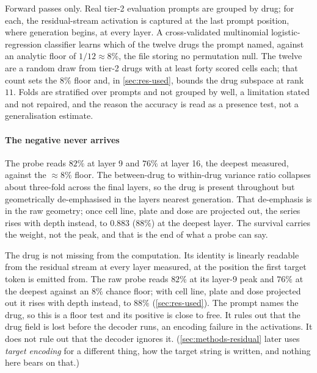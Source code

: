 Forward passes only. Real tier-2 evaluation prompts are grouped by drug; for
each, the residual-stream activation is captured at the last prompt position,
where generation begins, at every layer. A cross-validated multinomial
logistic-regression classifier learns which of the twelve drugs the prompt named,
against an analytic floor of $1/12 \approx 8\%$, the file storing no
permutation null. The twelve
are a random draw from tier-2 drugs with at least forty scored cells each; that
count sets the $8\%$ floor and, in \cref{sec:res-used}, bounds the drug subspace
at rank $11$. Folds are stratified over prompts and not grouped by well, a
limitation stated and not repaired, and the reason the accuracy is read as a
presence test, not a generalisation estimate.

\paragraph{The negative never arrives} The probe reads $82\%$ at layer 9 and
$76\%$ at layer 16, the deepest measured, against the $\approx 8\%$ floor. The
between-drug to within-drug variance ratio collapses about three-fold across the
final layers, so the drug is present throughout but geometrically de-emphasised
in the layers nearest generation. That de-emphasis is in the raw geometry; once
cell line, plate and dose are projected out, the series rises with depth instead, to
$0.883$ ($88\%$) at the deepest layer. The survival carries the weight, not the
peak, and that is the end of what a probe can say.

\begin{claim}
The drug is not missing from the computation. Its identity is linearly readable
from the residual stream at every layer measured, at the position the first
target token is emitted from. The raw probe reads $82\%$ at its layer-9 peak
and $76\%$ at the deepest against an $8\%$ chance floor; with cell line, plate
and dose projected out it rises with depth instead, to $88\%$
(\cref{sec:res-used}). The prompt names the drug, so this is a floor test and its
positive is close to free. It rules out that the drug field is lost before the
decoder runs, an encoding failure in the activations. It does not rule out that
the decoder ignores it. (\cref{sec:methods-residual} later uses \emph{target
encoding} for a different thing, how the target string is written, and nothing
here bears on that.)
\end{claim}


